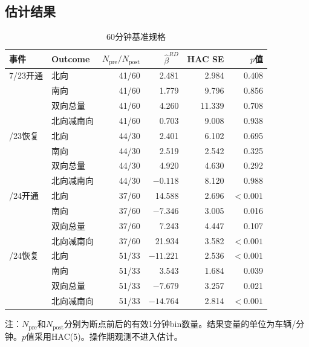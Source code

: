 \documentclass[11pt,a4paper]{ctexart}
\begin{document}
\subsection{估计结果}

\begin{table}[H]
\centering
\caption{60分钟基准规格}
\label{tab:baseline}
\begin{threeparttable}
\begin{tabular}{llrrrr}
\toprule
事件 & Outcome & $N_{\mathrm{pre}}/N_{\mathrm{post}}$ & $\widehat\beta^{RD}$ & HAC SE & $p$值 \\
\midrule
7/23开通 & 北向 & 41/60 & 2.481 & 2.984 & 0.408 \\
 & 南向 & 41/60 & 1.779 & 9.796 & 0.856 \\
 & 双向总量 & 41/60 & 4.260 & 11.339 & 0.708 \\
 & 北向减南向 & 41/60 & 0.703 & 9.008 & 0.938 \\
\addlinespace
7/23恢复 & 北向 & 44/30 & 2.401 & 6.102 & 0.695 \\
 & 南向 & 44/30 & 2.519 & 2.542 & 0.325 \\
 & 双向总量 & 44/30 & 4.920 & 4.630 & 0.292 \\
 & 北向减南向 & 44/30 & $-0.118$ & 8.120 & 0.988 \\
\addlinespace
7/24开通 & 北向 & 37/60 & 14.588 & 2.696 & $<0.001$ \\
 & 南向 & 37/60 & $-7.346$ & 3.005 & 0.016 \\
 & 双向总量 & 37/60 & 7.243 & 4.447 & 0.107 \\
 & 北向减南向 & 37/60 & 21.934 & 3.582 & $<0.001$ \\
\addlinespace
7/24恢复 & 北向 & 51/33 & $-11.221$ & 2.536 & $<0.001$ \\
 & 南向 & 51/33 & 3.543 & 1.684 & 0.039 \\
 & 双向总量 & 51/33 & $-7.679$ & 3.257 & 0.021 \\
 & 北向减南向 & 51/33 & $-14.764$ & 2.814 & $<0.001$ \\
\bottomrule
\end{tabular}
\begin{tablenotes}[flushleft]\footnotesize
\item 注：$N_{\mathrm{pre}}$和$N_{\mathrm{post}}$分别为断点前后的有效1分钟bin数量。结果变量的单位为车辆/分钟。$p$值采用HAC(5)。操作期观测不进入估计。
\end{tablenotes}
\end{threeparttable}
\end{table}
\end{document}

